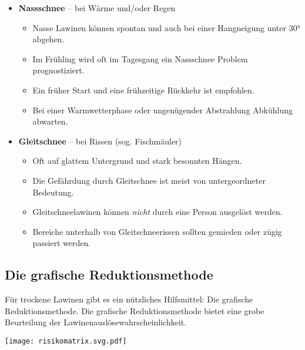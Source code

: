 \begin{itemize}
{  }
  \item{
    \textbf{Nassschnee} -- bei Wärme und/oder Regen
    \begin{itemize}
      \item{Nasse Lawinen können spontan und auch bei einer Hangneigung unter 30° abgehen.}
      \item{Im Frühling wird oft im Tagesgang ein Nassschnee Problem prognostiziert.}
      \item{Ein früher Start und eine frühzeitige Rückkehr ist empfohlen.}
      \item{Bei einer Warmwetterphase oder ungenügender Abstrahlung Abkühlung abwarten.}
    \end{itemize}
  }
  \item{
    \textbf{Gleitschnee} -- bei Rissen (sog. Fischmäuler)
    \begin{itemize}
      \item{Oft auf glattem Untergrund und stark besonnten Hängen.}
      \item{Die Gefährdung durch Gleitschnee ist meist von untergeordneter Bedeutung.}
      \item{Gleitschneelawinen können \textit{nicht} durch eine Person ausgelöst werden.}
      \item{Bereiche unterhalb von Gleitschneerissen sollten gemieden oder zügig passiert werden.}
    \end{itemize}
  }
\end{itemize}

\newcolumn

\subsection{Die grafische Reduktionsmethode}

Für trockene Lawinen gibt es ein nützliches Hilfsmittel: Die grafische Reduktionsmethode.
Die grafische Reduktionsmethode bietet eine grobe Beurteilung der Lawinenauslösewahrscheinlichkeit.

\begin{center}
  \texttt{[image: risikomatrix.svg.pdf]}
\end{center}

\newcolumn